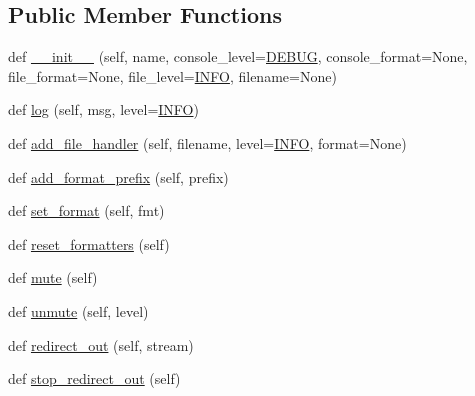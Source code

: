 \subsection*{Public Member Functions}
\begin{DoxyCompactItemize}
\item 
def \hyperlink{classparlai_1_1utils_1_1logging_1_1ParlaiLogger_ade632e1d848beb962a35797c02f51407}{\+\_\+\+\_\+init\+\_\+\+\_\+} (self, name, console\+\_\+level=\hyperlink{namespaceparlai_1_1utils_1_1logging_ab324194e88a7aab20579ec176d8e47ed}{D\+E\+B\+UG}, console\+\_\+format=None, file\+\_\+format=None, file\+\_\+level=\hyperlink{namespaceparlai_1_1utils_1_1logging_a4bc2de74317465e5d1a8b5d7b913d48a}{I\+N\+FO}, filename=None)
\item 
def \hyperlink{classparlai_1_1utils_1_1logging_1_1ParlaiLogger_aa545862a0e5c55d67989cc8ea7d545a1}{log} (self, msg, level=\hyperlink{namespaceparlai_1_1utils_1_1logging_a4bc2de74317465e5d1a8b5d7b913d48a}{I\+N\+FO})
\item 
def \hyperlink{classparlai_1_1utils_1_1logging_1_1ParlaiLogger_abaeed79f85f8b00792bcb3557f955e9e}{add\+\_\+file\+\_\+handler} (self, filename, level=\hyperlink{namespaceparlai_1_1utils_1_1logging_a4bc2de74317465e5d1a8b5d7b913d48a}{I\+N\+FO}, format=None)
\item 
def \hyperlink{classparlai_1_1utils_1_1logging_1_1ParlaiLogger_a160769d211d1700c2922c1ff65c83734}{add\+\_\+format\+\_\+prefix} (self, prefix)
\item 
def \hyperlink{classparlai_1_1utils_1_1logging_1_1ParlaiLogger_a1066ef97668ebb94d3204ccac1bed8f6}{set\+\_\+format} (self, fmt)
\item 
def \hyperlink{classparlai_1_1utils_1_1logging_1_1ParlaiLogger_a48e352dd5d21a2bb0637653b9bc7b354}{reset\+\_\+formatters} (self)
\item 
def \hyperlink{classparlai_1_1utils_1_1logging_1_1ParlaiLogger_a560f0cf26c3eaae2d785c4f35cae2c4b}{mute} (self)
\item 
def \hyperlink{classparlai_1_1utils_1_1logging_1_1ParlaiLogger_ad00121b486f8553c45d9ab13e81567ab}{unmute} (self, level)
\item 
def \hyperlink{classparlai_1_1utils_1_1logging_1_1ParlaiLogger_a22d5f670d10de4270b40bf3c683a9fd1}{redirect\+\_\+out} (self, stream)
\item 
def \hyperlink{classparlai_1_1utils_1_1logging_1_1ParlaiLogger_ad9b882180fc5cc0b81351f50d7fcd252}{stop\+\_\+redirect\+\_\+out} (self)
\end{DoxyCompactItemize}

